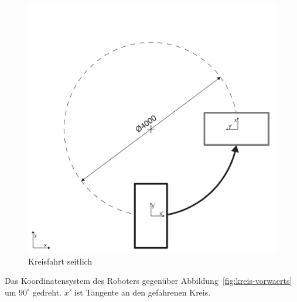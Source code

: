 \begin{figure}[H]
    \centering
    \includegraphics[width=.6\textwidth]{Abbildungen/Viertelkreis-seitwaerts}
    \caption{Kreisfahrt seitlich}
    \label{fig:kreis-seitwaerts}
\end{figure}
Das Koordinatensystem des Roboters gegenüber Abbildung~\ref{fig:kreis-vorwaerts} um $90^\circ$ gedreht. $x'$ ist Tangente an den gefahrenen Kreis.